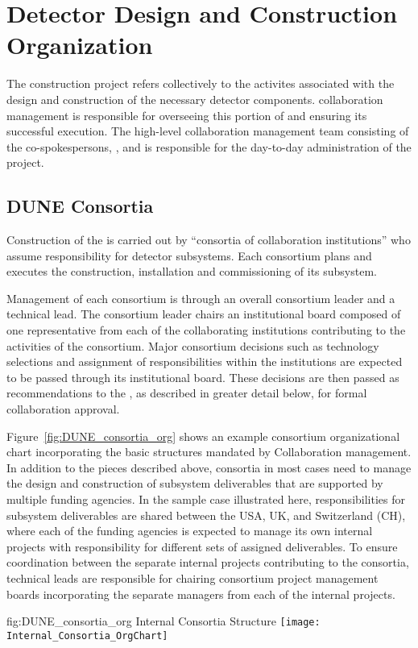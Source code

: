 \chapter{Detector Design and Construction Organization}
\label{vl:tc-overview}

The   construction project refers collectively 
to the activites associated with the design and construction of the
necessary detector components.   collaboration management 
is responsible for overseeing this portion of  and 
ensuring its successful execution.  The high-level  
collaboration management team consisting of the co-spokespersons, 
, and  is responsible for the day-to-day 
administration of the project.  

\section{DUNE Consortia}
\label{sec:consortia}

Construction of the   is carried out by 
``consortia of collaboration institutions'' who assume responsibility 
for detector subsystems.  Each consortium plans and executes the 
construction, installation and commissioning of its subsystem.

Management of each consortium is through an overall consortium leader 
and a technical lead.  The consortium leader chairs an institutional 
board composed of one representative from each of the collaborating 
institutions contributing to the activities of the consortium.  Major 
consortium decisions such as technology selections and assignment of 
responsibilities within the institutions are expected to be passed 
through its institutional board.  These decisions are then passed 
as recommendations to the  , as described in 
greater detail below, for formal collaboration approval.

Figure~\ref{fig:DUNE_consortia_org} shows an example consortium 
organizational chart incorporating the basic structures mandated 
by  Collaboration management.  In addition to the pieces 
described above, consortia in most cases need to manage the design 
and construction of subsystem deliverables that are supported by 
multiple funding agencies.  In the sample case illustrated here, 
responsibilities for subsystem deliverables are shared between the 
USA, UK, and Switzerland (CH), where each of the funding agencies 
is expected to manage its own internal projects with responsibility 
for different sets of assigned deliverables.  To ensure coordination 
between the separate internal projects contributing to the consortia, 
technical leads are responsible for chairing consortium project 
management boards incorporating the separate managers from each of 
the internal projects.   
\begin{dunefigure}{fig:DUNE_consortia_org}
  { Internal Consortia Structure}
  \texttt{[image: Internal\_Consortia\_OrgChart]}
\end{dunefigure}

